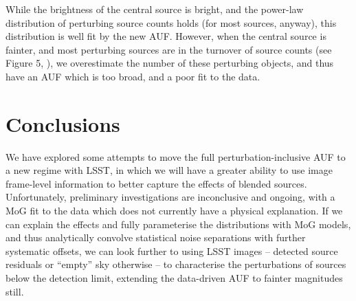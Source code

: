 \documentclass[fleqn,usenatbib]{mnras}
\begin{document}
While the brightness of the central source is bright, and the power-law distribution of perturbing source counts holds (for most sources, anyway), this distribution is well fit by the new AUF. However, when the central source is fainter, and most perturbing sources are in the turnover of source counts (see Figure 5, \citealt{2018MNRAS.481.2148W}), we overestimate the number of these perturbing objects, and thus have an AUF which is too broad, and a poor fit to the data.

\section{Conclusions}
We have explored some attempts to move the full perturbation-inclusive AUF to a new regime with LSST, in which we will have a greater ability to use image frame-level information to better capture the effects of blended sources. Unfortunately, preliminary investigations are inconclusive and ongoing, with a MoG fit to the data which does not currently have a physical explanation. If we can explain the effects and fully parameterise the distributions with MoG models, and thus analytically convolve statistical noise separations with further systematic offsets, we can look further to using LSST images -- detected source residuals or ``empty'' sky otherwise -- to characterise the perturbations of sources below the detection limit, extending the data-driven AUF to fainter magnitudes still.







\bsp	%
\label{lastpage}
\end{document}
